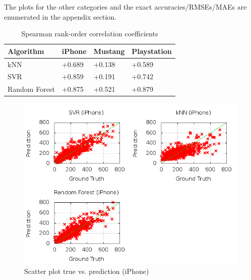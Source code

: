 The plots for the other categories and the exact accuracies/RMSEs/MAEs are enumerated in the appendix section.
\begin{table}[h!]
	\begin{center}
	\begin{tabular}{| p{3.25cm} | p{3.25cm} | p{3.25cm} | p{3.25cm} |}
		\hline
		\textbf{Algorithm} & \textbf{iPhone} & \textbf{Mustang} & \textbf{Playstation} \\
		\hline
		kNN & +0.689 & +0.138 & +0.589 \\
		\hline
		SVR & +0.859 & +0.191 & +0.742 \\
		\hline
		Random Forest & +0.875 & +0.521 & +0.879 \\
		\hline
	\end{tabular}
	\end{center}
	\caption{Spearman rank-order correlation coefficients}
	\label{tab:corr}
\end{table}
\begin{figure}
\centering
\includegraphics[scale=0.55]{images/plots/machine_learning/iphone/true_pred_iphone.png}
\caption{Scatter plot true vs. prediction (iPhone)}
\label{true_predict_iphone}
\end{figure}
